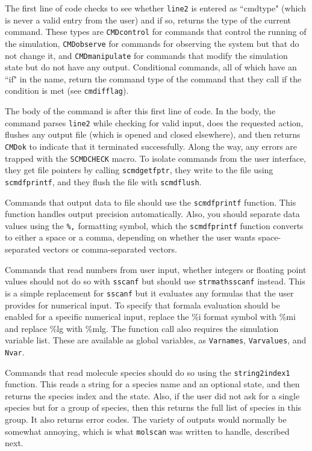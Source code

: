 \documentclass {scrbook}
\newcommand {\ttt} {\texttt}
\begin{document}
The first line of code checks to see whether \ttt{line2} is entered as ``cmdtype" (which is never a valid entry from the user) and if so, returns the type of the current command. These types are \ttt{CMDcontrol} for commands that control the running of the simulation, \ttt{CMDobserve} for commands for observing the system but that do not change it, and \ttt{CMDmanipulate} for commands that modify the simulation state but do not have any output. Conditional commands, all of which have an ``if" in the name, return the command type of the command that they call if the condition is met (see \ttt{cmdifflag}).

The body of the command is after this first line of code. In the body, the command parses \ttt{line2} while checking for valid input, does the requested action, flushes any output file (which is opened and closed elsewhere), and then returns \ttt{CMDok} to indicate that it terminated successfully. Along the way, any errors are trapped with the \ttt{SCMDCHECK} macro. To isolate commands from the user interface, they get file pointers by calling \ttt{scmdgetfptr}, they write to the file using \ttt{scmdfprintf}, and they flush the file with \ttt{scmdflush}.

Commands that output data to file should use the \ttt{scmdfprintf} function. This function handles output precision automatically. Also, you should separate data values using the \ttt{\%,} formatting symbol, which the \ttt{scmdfprintf} function converts to either a space or a comma, depending on whether the user wants space-separated vectors or comma-separated vectors.

Commands that read numbers from user input, whether integers or floating point values should not do so with \ttt{sscanf} but should use \ttt{strmathsscanf} instead. This is a simple replacement for \ttt{sscanf} but it evaluates any formulas that the user provides for numerical input. To specify that formala evaluation should be enabled for a specific numerical input, replace the \%i format symbol with \%mi and replace \%lg with \%mlg. The function call also requires the simulation variable list. These are available as global variables, as \ttt{Varnames}, \ttt{Varvalues}, and \ttt{Nvar}.

Commands that read molecule species should do so using the \ttt{string2index1} function. This reads a string for a species name and an optional state, and then returns the species index and the state. Also, if the user did not ask for a single species but for a group of species, then this returns the full list of species in this group. It also returns error codes. The variety of outputs would normally be somewhat annoying, which is what \ttt{molscan} was written to handle, described next.
\end{document}
